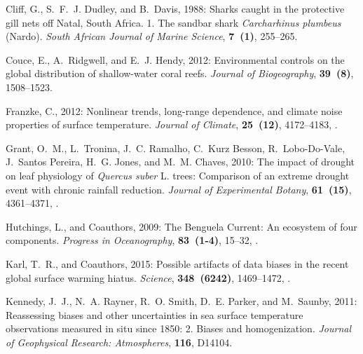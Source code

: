 \documentclass[]{ametsoc}
\begin{document}
\begin{thebibliography}{23}
Cliff, G., S.~F.~J. Dudley, and B.~Davis, 1988: {Sharks caught in the
  protective gill nets off Natal, South Africa. 1. The sandbar shark
  \textit{Carcharhinus plumbeus} (Nardo)}. \textit{South African Journal of Marine
  Science}, \textbf{7~(1)}, 255--265.

Couce, E., A.~Ridgwell, and E.~J. Hendy, 2012: {Environmental controls on the
  global distribution of shallow-water coral reefs}. \textit{Journal of
  Biogeography}, \textbf{39~(8)}, 1508--1523.

Franzke, C., 2012: {Nonlinear trends, long-range dependence, and climate noise
  properties of surface temperature}. \textit{Journal of Climate},
  \textbf{25~(12)}, 4172--4183, .

Grant, O.~M., L.~Tronina, J.~C. Ramalho, C.~{Kurz Besson}, R.~Lobo-Do-Vale,
  J.~{Santos Pereira}, H.~G. Jones, and M.~M. Chaves, 2010: {The impact of
  drought on leaf physiology of \textit{Quercus suber} L. trees: Comparison of an
  extreme drought event with chronic rainfall reduction}. \textit{Journal of
  Experimental Botany}, \textbf{61~(15)}, 4361--4371, .


Hutchings, L., and Coauthors, 2009: {The Benguela Current: An ecosystem of four
  components}. \textit{Progress in Oceanography}, \textbf{83~(1-4)}, 15--32,
  .

Karl, T.~R., and Coauthors, 2015: {Possible artifacts of data biases in the
  recent global surface warming hiatus}. \textit{Science}, \textbf{348~(6242)},
  1469--1472, .

Kennedy, J.~J., N.~A. Rayner, R.~O. Smith, D.~E. Parker, and M.~Saunby, 2011:
  {Reassessing biases and other uncertainties in sea surface temperature observations
  measured in situ since 1850: 2. Biases and homogenization}. \textit{Journal of
  Geophysical Research: Atmospheres}, \textbf{116}, D14104.


\end{thebibliography}
\end{document}
